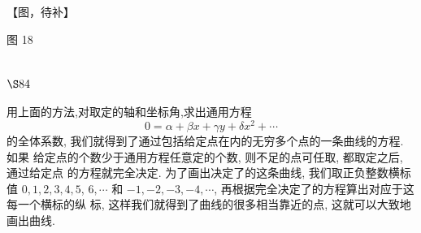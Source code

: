 【图，待补】

图 18

\section{$\S 84$}

用上面的方法,对取定的轴和坐标角,求出通用方程
\[
0=\alpha+\beta x+\gamma y+\delta x^{2}+\cdots
\]
的全体系数, 我们就得到了通过包括给定点在内的无穷多个点的一条曲线的方程. 如果 给定点的个数少于通用方程任意定的个数, 则不足的点可任取, 都取定之后, 通过给定点 的方程就完全决定. 为了画出决定了的这条曲线, 我们取正负整数横标值 $0,1,2,3,4,5$, $6, \cdots$ 和 $-1,-2,-3,-4, \cdots$, 再根据完全决定了的方程算出对应于这每一个横标的纵 标, 这样我们就得到了曲线的很多相当靠近的点, 这就可以大致地画出曲线. 

